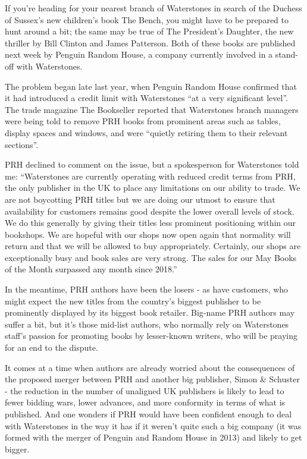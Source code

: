 If you're heading for your nearest branch of Waterstones in search of the Duchess of Sussex's new children's book The Bench, you might have to be prepared to hunt around a bit; the same may be true of The President's Daughter, the new thriller by Bill Clinton and James Patterson. Both of these books are published next week by Penguin Random House, a company currently involved in a stand-off with Waterstones.


The problem began late last year, when Penguin Random House confirmed that it had introduced a credit limit with Waterstones ``at a very significant level''. The trade magazine The Bookseller reported that Waterstones branch managers were being told to remove PRH books from prominent areas such as tables, display spaces and windows, and were ``quietly retiring them to their relevant sections''.


PRH declined to comment on the issue, but a spokesperson for Waterstones told me: ``Waterstones are currently operating with reduced credit terms from PRH, the only publisher in the UK to place any limitations on our ability to trade. We are not boycotting PRH titles but we are doing our utmost to ensure that availability for customers remains good despite the lower overall levels of stock. We do this generally by giving their titles less prominent positioning within our bookshops. We are hopeful with our shops now open again that normality will return and that we will be allowed to buy appropriately. Certainly, our shops are exceptionally busy and book sales are very strong. The sales for our May Books of the Month surpassed any month since 2018.''


In the meantime, PRH authors have been the losers - as have customers, who might expect the new titles from the country's biggest publisher to be prominently displayed by its biggest book retailer. Big-name PRH authors may suffer a bit, but it's those mid-list authors, who normally rely on Waterstones staff's passion for promoting books by lesser-known writers, who will be praying for an end to the dispute.


It comes at a time when authors are already worried about the consequences of the proposed merger between PRH and another big publisher, Simon \& Schuster - the reduction in the number of unaligned UK publishers is likely to lead to fewer bidding wars, lower advances, and more conformity in terms of what is published. And one wonders if PRH would have been confident enough to deal with Waterstones in the way it has if it weren't quite such a big company (it was formed with the merger of Penguin and Random House in 2013) and likely to get bigger.


